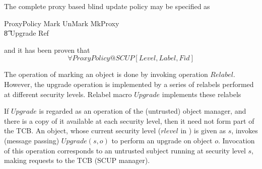 The complete proxy based blind update policy may be specified as
\begin{zed}
ProxyPolicy  Mark \land UnMark \land MkProxy \\
\t8 \land Upgrade \land Ref  
\end{zed}
and it has been proven that
\[ \forall ProxyPolicy @ SCUP[Level,Label,Fid] \]

The operation of marking an object is done by invoking
operation $Relabel$. 
However, the upgrade operation is implemented by a series
of relabels performed at different security levels.  
Relabel macro $Upgrade$ implements these relabels
\begin{center}
\end{center}
If $Upgrade$ is regarded as an operation of the (untrusted) object
manager, and  there is a copy of it available at each security level, then
it need not form part of the TCB. An object, whose current security level
($rlevel$ in \cite{jajodia:mf:90}) is given as $s$, invokes (message
passing) $Upgrade(s,o)$ to perform an upgrade on object $o$. Invocation of 
this operation corresponds to an untrusted subject running at 
security level $s$, making requests to the TCB (SCUP manager).

